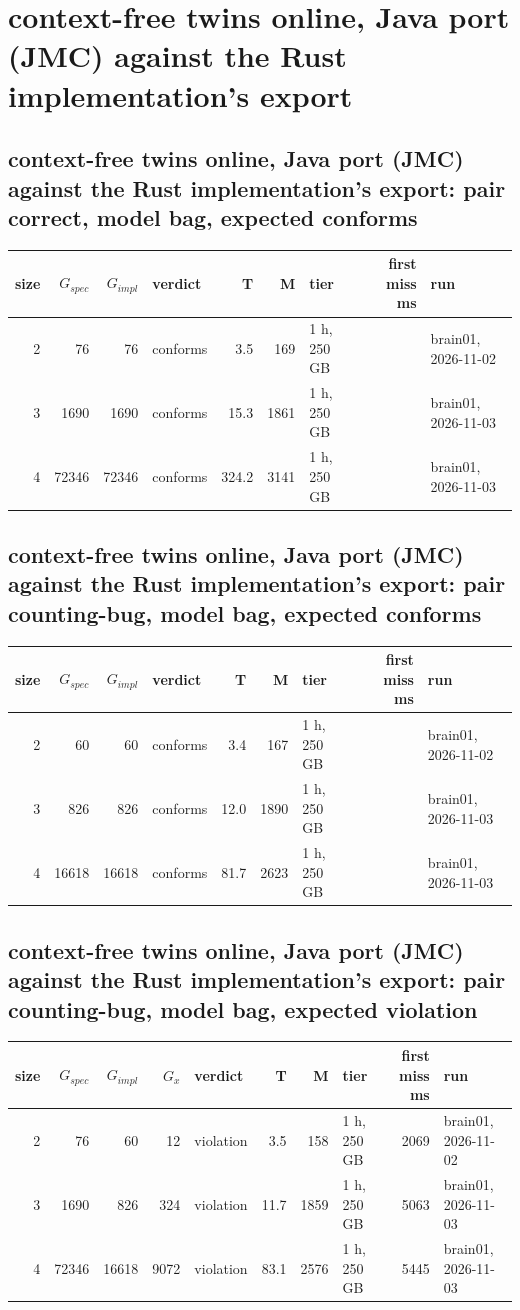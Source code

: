 \documentclass[10pt]{article}
\begin{document}
\section*{context-free twins online, Java port (JMC) against the Rust implementation's export}
\subsection*{context-free twins online, Java port (JMC) against the Rust implementation's export: pair \textsf{correct}, model bag, expected conforms}
\begin{longtable}{@{}rrrlrrlrl@{}}
\toprule
size & $G_{\mathit{spec}}$ & $G_{\mathit{impl}}$ & verdict & T & M & tier & first miss ms & run \\
\midrule
\endhead
\color{red} 2 & 76 & 76 & conforms & 3.5 & 169 & 1 h, 250 GB &  & brain01, 2026-11-02 \\
\color{blue} 3 & 1690 & 1690 & conforms & 15.3 & 1861 & 1 h, 250 GB &  & brain01, 2026-11-03 \\
\color{blue} 4 & 72346 & 72346 & conforms & 324.2 & 3141 & 1 h, 250 GB &  & brain01, 2026-11-03 \\
\bottomrule
\end{longtable}
\subsection*{context-free twins online, Java port (JMC) against the Rust implementation's export: pair \textsf{counting-bug}, model bag, expected conforms}
\begin{longtable}{@{}rrrlrrlrl@{}}
\toprule
size & $G_{\mathit{spec}}$ & $G_{\mathit{impl}}$ & verdict & T & M & tier & first miss ms & run \\
\midrule
\endhead
\color{red} 2 & 60 & 60 & conforms & 3.4 & 167 & 1 h, 250 GB &  & brain01, 2026-11-02 \\
\color{blue} 3 & 826 & 826 & conforms & 12.0 & 1890 & 1 h, 250 GB &  & brain01, 2026-11-03 \\
\color{blue} 4 & 16618 & 16618 & conforms & 81.7 & 2623 & 1 h, 250 GB &  & brain01, 2026-11-03 \\
\bottomrule
\end{longtable}
\subsection*{context-free twins online, Java port (JMC) against the Rust implementation's export: pair \textsf{counting-bug}, model bag, expected violation}
\begin{longtable}{@{}rrrrlrrlrl@{}}
\toprule
size & $G_{\mathit{spec}}$ & $G_{\mathit{impl}}$ & $G_x$ & verdict & T & M & tier & first miss ms & run \\
\midrule
\endhead
\color{red} 2 & 76 & 60 & 12 & violation & 3.5 & 158 & 1 h, 250 GB & 2069 & brain01, 2026-11-02 \\
\color{blue} 3 & 1690 & 826 & 324 & violation & 11.7 & 1859 & 1 h, 250 GB & 5063 & brain01, 2026-11-03 \\
\color{blue} 4 & 72346 & 16618 & 9072 & violation & 83.1 & 2576 & 1 h, 250 GB & 5445 & brain01, 2026-11-03 \\
\bottomrule
\end{longtable}
\end{document}
